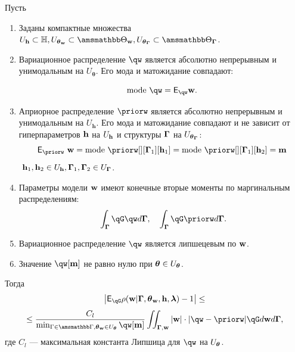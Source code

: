 \begin{lemma}
\label{lem:cp_bound}
Пусть
\begin{enumerate}

\item Заданы компактные множества $\Uh \subset \Hb, \Utetaw \subset \Tetawb, \UtetaG \subset \TetaGb$.

\item Вариационное распределение $\qw$  является абсолютно непрерывным и унимодальным на  $U_{\boldsymbol{\theta}}$.
Его мода и матожидание совпадают:

\[
  \text{mode}~\qw = \E_{\qw} \w.
\]




\item Априорное распределение $\priorw$ является абсолютно непрерывным и унимодальным на  $U_\mathbf{h}$. Его мода и матожидание совпадают и не зависит от гиперпараметров $\mathbf{h}$  на $U_{\mathbf{h}}$ и структуры $\boldsymbol{\Gamma}$ на $U_{\boldsymbol{\theta}_{\boldsymbol{\Gamma}}}$:
\[
\E_{\priorw}~\w = \text{mode}~\priorw[][\G_1][\h_1]=\text{mode}~\priorw[][\G_1][\h_2]=\mathbf{m}
\]
$~\mathbf{h}_1,\mathbf{h}_2 \in U_{\mathbf{h}}, \boldsymbol{\Gamma}_1,\boldsymbol{\Gamma}_2 \in U_{\boldsymbol{\Gamma}}$.


\item Параметры модели $\mathbf{w}$ имеют конечные вторые моменты по маргинальным распределениям:
\[
   \int_{\G}\qG\qw d\G, \quad \int_{\G}\qG\priorw d\G.
\]


\item Вариационное распределение $\qw$ является липшецевым по $\mathbf{w}$.

\item Значение $\qw[\mathbf{m}]$ не равно нулю при $\boldsymbol{\theta} \in U_{\boldsymbol{\theta}}$.
\end{enumerate}
Тогда 
\[
   \left|\E_{\qG} {\rho}(\w|\G, \tetaw, \h, \lam) - 1\right| \leq
\]
\[
\leq \frac{C_l}{\min_{\Gamma \in \Gb, \tetaw \in \Uteta} \qw[\mathbf{m}]} \iint_{\G,\w} |\w| \cdot |\qw - \priorw|\qG d\w d\G,
\]
где $C_l$ --- максимальная константа Липшица для $\qw$ на $U_{\boldsymbol{\theta}}$.

\end{lemma}
